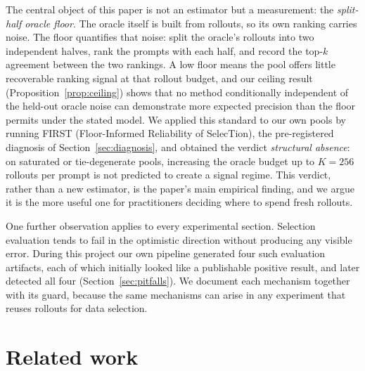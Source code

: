 \documentclass[11pt]{article}
\begin{document}
The central object of this paper is not an estimator but a measurement: the
\emph{split-half oracle floor}. The oracle itself is built from rollouts, so
its own ranking carries noise. The floor quantifies that noise: split the
oracle's rollouts into two independent halves, rank the prompts with each
half, and record the top-$k$ agreement between the two rankings. A low floor
means the pool offers little recoverable ranking signal at that rollout
budget, and our ceiling result (Proposition~\ref{prop:ceiling}) shows that no
method conditionally independent of the held-out oracle noise can demonstrate
more expected precision than the floor permits under the stated model. We applied this
standard to our own pools by running FIRST (Floor-Informed Reliability of
SelecTion), the pre-registered diagnosis of Section~\ref{sec:diagnosis}, and
obtained the verdict \emph{structural absence}: on saturated or
tie-degenerate pools, increasing the oracle budget up to $K{=}256$ rollouts
per prompt is not predicted to create a signal regime. This verdict, rather
than a new estimator, is the paper's main empirical finding, and we argue it
is the more useful one for practitioners deciding where to spend fresh
rollouts.

One further observation applies to every experimental section. Selection
evaluation tends to fail in the optimistic direction without producing any
visible error. During this project our own pipeline generated four such
evaluation artifacts, each of which initially looked like a publishable
positive result, and later detected all four (Section~\ref{sec:pitfalls}).
We document each mechanism together with its guard, because the same
mechanisms can arise in any experiment that reuses rollouts for data
selection.

\section{Related work}
\label{sec:related}
\end{document}
